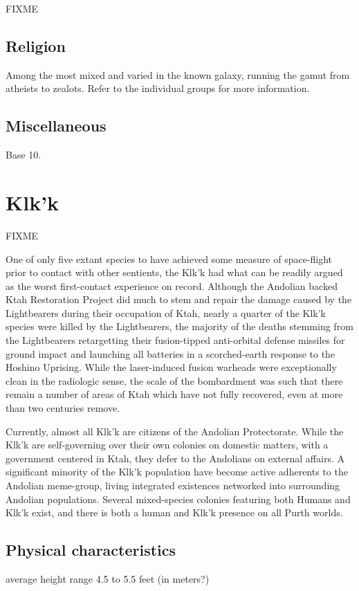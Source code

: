 FIXME 

\subsection{Religion}
Among the most mixed and varied in the known galaxy, running the gamut
from atheists to zealots. Refer to the individual groups for more
information.

\subsection{Miscellaneous}
Base 10. 

\section{Klk'k}
FIXME 

 
One of only five extant species to have achieved some measure of
space-flight prior to contact with other sentients, the Klk'k had what
can be readily argued as the worst first-contact experience on
record. Although the Andolian backed Ktah Restoration Project did much
to stem and repair the damage caused by the Lightbearers during their
occupation of Ktah, nearly a quarter of the Klk'k species were killed
by the Lightbearers, the majority of the deaths stemming from the
Lightbearers retargetting their fusion-tipped anti-orbital defense
missiles for ground impact and launching all batteries in a
scorched-earth response to the Hoshino Uprising. While the
laser-induced fusion warheads were exceptionally clean in the
radiologic sense, the scale of the bombardment was such that there
remain a number of areas of Ktah which have not fully recovered, even
at more than two centuries remove.

Currently, almost all Klk'k are citizens of the Andolian
Protectorate. While the Klk'k are self-governing over their own
colonies on domestic matters, with a government centered in Ktah, they
defer to the Andolians on external affairs. A significant minority of
the Klk'k population have become active adherents to the Andolian
meme-group, living integrated existences networked into surrounding
Andolian populations. Several mixed-species colonies featuring both
Humans and Klk'k exist, and there is both a human and Klk'k presence
on all Purth worlds.


\subsection{Physical characteristics}
average height range 4.5 to 5.5 feet (in meters?)

